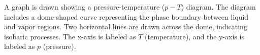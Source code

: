 A graph is drawn showing a pressure-temperature (\(p-T\)) diagram. The diagram includes a dome-shaped curve representing the phase boundary between liquid and vapor regions. Two horizontal lines are drawn across the dome, indicating isobaric processes. The x-axis is labeled as \(T\) (temperature), and the y-axis is labeled as \(p\) (pressure).